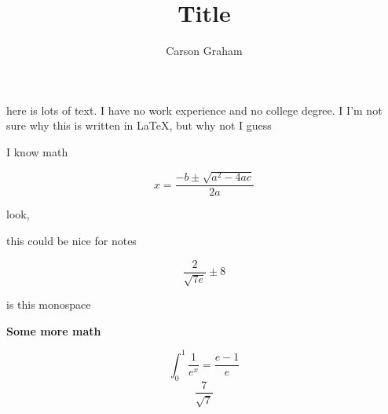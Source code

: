 \documentclass[10pt,letterpaper]{article}
\title{Title}
\author{Carson Graham}
\begin{document}
    \maketitle


    here is lots of text.
    I have no work experience and no college degree.
    I I'm not sure why this is written in \LaTeX,
    but why not I guess

    I know math

    $$ x = \frac{ -b \pm \sqrt{a ^ 2 - 4ac}}{2a} $$

    look, 

    this could be nice for notes

    
    $$ \frac{2}{\sqrt{7e}} \pm 8 $$

    \textsf{is this monospace}

    \textbf{Some more math}



    $$\int_0^1 \frac{1}{e^x} = \frac{e-1}{e}$$
    $$ \frac{7}{\sqrt{7}} $$
\end{document}
